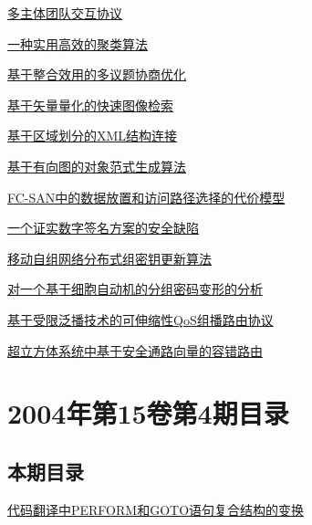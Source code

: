 \documentclass[a4paper]{article}
\begin{document}
\href{http://www.jos.org.cn/ch/reader/download_pdf.aspx?file_no=20040507&year_id=2004&quarter_id=5&falg=1}{多主体团队交互协议}

\href{http://www.jos.org.cn/ch/reader/download_pdf.aspx?file_no=20040508&year_id=2004&quarter_id=5&falg=1}{一种实用高效的聚类算法}

\href{http://www.jos.org.cn/ch/reader/download_pdf.aspx?file_no=20040509&year_id=2004&quarter_id=5&falg=1}{基于整合效用的多议题协商优化}

\href{http://www.jos.org.cn/ch/reader/download_pdf.aspx?file_no=20040510&year_id=2004&quarter_id=5&falg=1}{基于矢量量化的快速图像检索}

\href{http://www.jos.org.cn/ch/reader/download_pdf.aspx?file_no=20040511&year_id=2004&quarter_id=5&falg=1}{基于区域划分的XML结构连接}

\href{http://www.jos.org.cn/ch/reader/download_pdf.aspx?file_no=20040512&year_id=2004&quarter_id=5&falg=1}{基于有向图的对象范式生成算法}

\href{http://www.jos.org.cn/ch/reader/download_pdf.aspx?file_no=20040513&year_id=2004&quarter_id=5&falg=1}{FC-SAN中的数据放置和访问路径选择的代价模型}

\href{http://www.jos.org.cn/ch/reader/download_pdf.aspx?file_no=20040514&year_id=2004&quarter_id=5&falg=1}{一个证实数字签名方案的安全缺陷}

\href{http://www.jos.org.cn/ch/reader/download_pdf.aspx?file_no=20040515&year_id=2004&quarter_id=5&falg=1}{移动自组网络分布式组密钥更新算法}

\href{http://www.jos.org.cn/ch/reader/download_pdf.aspx?file_no=20040516&year_id=2004&quarter_id=5&falg=1}{对一个基于细胞自动机的分组密码变形的分析}

\href{http://www.jos.org.cn/ch/reader/download_pdf.aspx?file_no=20040517&year_id=2004&quarter_id=5&falg=1}{基于受限泛播技术的可伸缩性QoS组播路由协议}

\href{http://www.jos.org.cn/ch/reader/download_pdf.aspx?file_no=20040518&year_id=2004&quarter_id=5&falg=1}{超立方体系统中基于安全通路向量的容错路由}


\section{\textbf{2004年第15卷第4期目录}}
\subsection{本期目录}
\href{http://www.jos.org.cn/ch/reader/download_pdf.aspx?file_no=20040401&year_id=2004&quarter_id=4&falg=1}{代码翻译中PERFORM和GOTO语句复合结构的变换}
\end{document}
